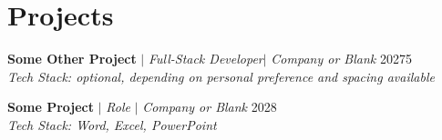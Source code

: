 \section{Projects}
\resumeSubHeadingListStart

    \resumeProjectHeading
    {\textbf{Some Other Project} $|$ \emph{Full-Stack Developer}$|$ \emph{Company or Blank}} {20275}   
    {\\ \vspace{2mm} \emph{\small{Tech Stack: optional, depending on personal preference and spacing available}}} \vspace{-2.5mm}
    \resumeItemListStart
    \resumeItemListEnd

    \iffalse
    \resumeProjectHeading
    {\textbf{{Some Other Project} } $|$ \emph{Role }$|$ \emph{Company or Blank}} {2029}   
    {\\ \vspace{2mm} \emph{\small{Tech Stack: Word, Excel, PowerPoint}}} \vspace{-2.5mm}
    \resumeItemListStart
        \resumeItem{Mention the duration of your projects is optional}
    \resumeItemListEnd
    \fi

    \resumeProjectHeading
    {\textbf{{Some Project} } $|$ \emph{Role }$|$ \emph{Company or Blank}} {2028}   
    {\\ \vspace{2mm} \emph{\small{Tech Stack: Word, Excel, PowerPoint}}} \vspace{-2.5mm}
    \resumeItemListStart
    \resumeItemListEnd

\resumeSubHeadingListEnd